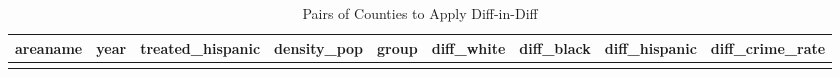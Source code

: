 \documentclass{article}
\begin{document}
\begin{table}[tbp] \centering%
\caption{Pairs of Counties to Apply Diff-in-Diff}%
\begin{tabularx}{\textwidth}{lCCCCCCCC}
\toprule
areaname&year&treated\_hispanic&density\_pop&group&diff\_white&diff\_black&diff\_hispanic&diff\_crime\_rate \tabularnewline
\midrule\addlinespace[1.5ex]
\bottomrule \addlinespace[1.5ex]
\end{tabularx}%
\end{table}%
\end{document}
